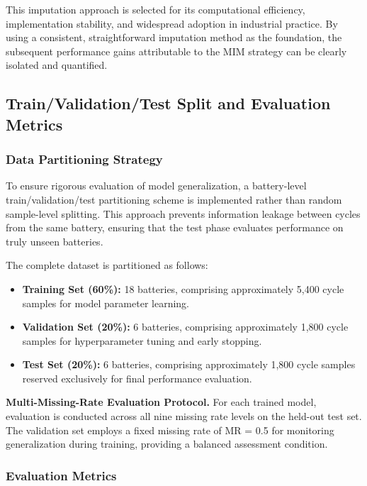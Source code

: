 \documentclass[5p,times]{elsarticle}
\begin{document}
This imputation approach is selected for its computational efficiency, implementation stability, and widespread adoption in industrial practice. By using a consistent, straightforward imputation method as the foundation, the subsequent performance gains attributable to the MIM strategy can be clearly isolated and quantified.

\subsection{Train/Validation/Test Split and Evaluation Metrics}\label{sec:evaluation}

\subsubsection{Data Partitioning Strategy}

To ensure rigorous evaluation of model generalization, a battery-level train/validation/test partitioning scheme is implemented rather than random sample-level splitting. This approach prevents information leakage between cycles from the same battery, ensuring that the test phase evaluates performance on truly unseen batteries.

The complete dataset is partitioned as follows:
\begin{itemize}
    \item \textbf{Training Set (60\%):} 18 batteries, comprising approximately 5,400 cycle samples for model parameter learning.
    \item \textbf{Validation Set (20\%):} 6 batteries, comprising approximately 1,800 cycle samples for hyperparameter tuning and early stopping.
    \item \textbf{Test Set (20\%):} 6 batteries, comprising approximately 1,800 cycle samples reserved exclusively for final performance evaluation.
\end{itemize}

\textbf{Multi-Missing-Rate Evaluation Protocol.} For each trained model, evaluation is conducted across all nine missing rate levels on the held-out test set. The validation set employs a fixed missing rate of MR = 0.5 for monitoring generalization during training, providing a balanced assessment condition.

\subsubsection{Evaluation Metrics}
\end{document}
